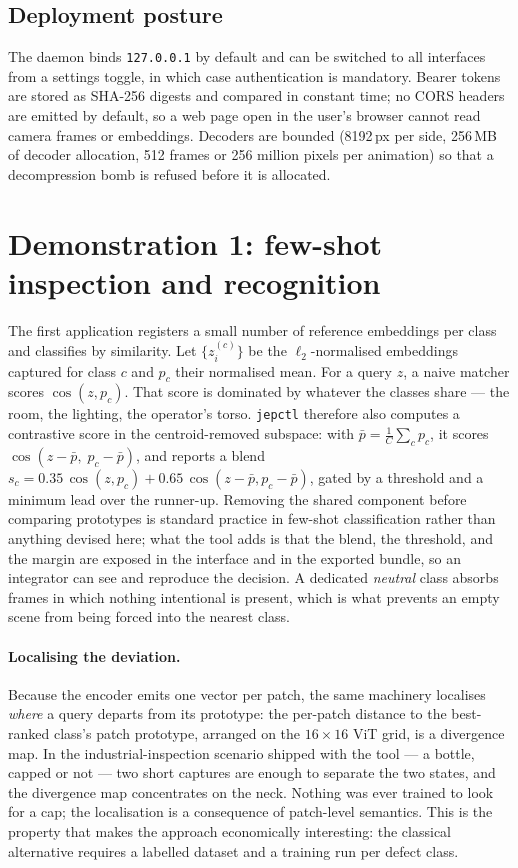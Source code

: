 \documentclass[11pt,onecolumn]{article}
\newcommand{\jepctl}{\texttt{jepctl}}
\newcommand{\code}[1]{\texttt{#1}}
\begin{document}
\subsection{Deployment posture}

The daemon binds \code{127.0.0.1} by default and can be switched to all interfaces from a
settings toggle, in which case authentication is mandatory. Bearer tokens are stored as
SHA-256 digests and compared in constant time; no CORS headers are emitted by default, so
a web page open in the user's browser cannot read camera frames or embeddings. Decoders
are bounded (8192\,px per side, 256\,MB of decoder allocation, 512 frames or 256 million
pixels per animation) so that a decompression bomb is refused before it is allocated.

\section{Demonstration 1: few-shot inspection and recognition}
\label{sec:fewshot}

The first application registers a small number of reference embeddings per class and
classifies by similarity. Let $\{z_i^{(c)}\}$ be the $\ell_2$-normalised embeddings
captured for class $c$ and $p_c$ their normalised mean. For a query $z$, a naive matcher
scores $\cos(z, p_c)$. That score is dominated by whatever the classes share --- the room,
the lighting, the operator's torso. \jepctl{} therefore also computes a contrastive score
in the centroid-removed subspace: with $\bar p = \frac{1}{C}\sum_c p_c$, it scores
$\cos(z - \bar p,\; p_c - \bar p)$, and reports a blend
$s_c = 0.35\,\cos(z,p_c) + 0.65\,\cos(z-\bar p, p_c - \bar p)$, gated by a threshold and a
minimum lead over the runner-up. Removing the shared component before comparing prototypes is
standard practice in few-shot classification rather than anything devised here; what the
tool adds is that the blend, the threshold, and the margin are exposed in the interface
and in the exported bundle, so an integrator can see and reproduce the decision. A
dedicated \emph{neutral} class absorbs frames in which
nothing intentional is present, which is what prevents an empty scene from being forced
into the nearest class.

\paragraph{Localising the deviation.}
Because the encoder emits one vector per patch, the same machinery localises \emph{where}
a query departs from its prototype: the per-patch distance to the best-ranked class's
patch prototype, arranged on the $16\times16$ ViT grid, is a divergence map. In the
industrial-inspection scenario shipped with the tool --- a bottle, capped or not --- two
short captures are enough to separate the two states, and the divergence map concentrates
on the neck. Nothing was ever trained to look for a cap; the localisation is a consequence
of patch-level semantics. This is the property that makes the approach economically
interesting: the classical alternative requires a labelled dataset and a training run per
defect class.
\end{document}

